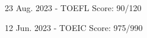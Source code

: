

\begin{cvskills}

  \cvskill
  {23 Aug. 2023 - TOEFL} %
  {Score: 90/120} %

  \cvskill
  {12 Jun. 2023 - TOEIC} %
  {Score: 975/990} %

\end{cvskills}
